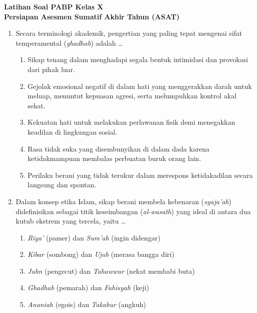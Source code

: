 \documentclass[12pt,a4paper]{article}
\begin{document}
\begin{center}
    \textbf{\Large Latihan Soal PABP Kelas X} \\
    \textbf{Persiapan Asesmen Sumatif Akhir Tahun (ASAT)}
\end{center}
\vspace{0.5cm}

\begin{enumerate}[leftmargin=*]


\item Secara terminologi akademik, pengertian yang paling tepat mengenai sifat temperamental (\textit{ghadhab}) adalah \dots
    \begin{enumerate}[label=\alph*.]
        \item Sikap tenang dalam menghadapi segala bentuk intimidasi dan provokasi dari pihak luar.
        \item Gejolak emosional negatif di dalam hati yang menggerakkan darah untuk meluap, menuntut kepuasan agresi, serta melumpuhkan kontrol akal sehat.
        \item Kekuatan hati untuk melakukan perlawanan fisik demi menegakkan keadilan di lingkungan sosial.
        \item Rasa tidak suka yang disembunyikan di dalam dada karena ketidakmampuan membalas perbuatan buruk orang lain.
        \item Perilaku berani yang tidak terukur dalam merespons ketidakadilan secara langsung dan spontan.
    \end{enumerate}

\item Dalam konsep etika Islam, sikap berani membela kebenaran (\textit{syaja'ah}) didefinisikan sebagai titik keseimbangan (\textit{al-wasath}) yang ideal di antara dua kutub ekstrem yang tercela, yaitu \dots
    \begin{enumerate}[label=\alph*.]
        \item \textit{Riya'} (pamer) dan \textit{Sum'ah} (ingin didengar)
        \item \textit{Kibar} (sombong) dan \textit{Ujub} (merasa bangga diri)
        \item \textit{Jubn} (pengecut) dan \textit{Tahawwur} (nekat membabi buta)
        \item \textit{Ghadhab} (pemarah) dan \textit{Fahisyah} (keji)
        \item \textit{Ananiah} (egois) dan \textit{Takabur} (angkuh)
    \end{enumerate}


\end{enumerate}
\end{document}
